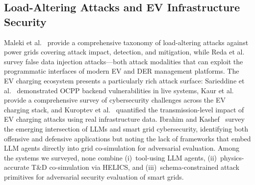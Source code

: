\subsection{Load-Altering Attacks and EV Infrastructure Security}
\label{sec:related:laa}

Maleki et al.~\cite{maleki2025laa} provide a comprehensive taxonomy of load-altering attacks against power grids covering attack impact, detection, and mitigation, while Reda et al.~\cite{reda2022fdia} survey false data injection attacks---both attack modalities that can exploit the programmatic interfaces of modern EV and DER management platforms.
The EV charging ecosystem presents a particularly rich attack surface: Sarieddine et al.~\cite{sarieddine2024ocpp} demonstrated OCPP backend vulnerabilities in live systems, Kaur et al.~\cite{kaur2025evcsur} provide a comprehensive survey of cybersecurity challenges across the EV charging stack, and Kuroptev et al.~\cite{kuroptev2026evgrid} quantified the transmission-level impact of EV charging attacks using real infrastructure data.
Ibrahim and Kashef~\cite{ibrahim2025llmgrid} survey the emerging intersection of LLMs and smart grid cybersecurity, identifying both offensive and defensive applications but noting the lack of frameworks that embed LLM agents directly into grid co-simulation for adversarial evaluation.
Among the systems we surveyed, none combine (i)~tool-using LLM agents, (ii)~physics-accurate T\&D co-simulation via HELICS, and (iii)~schema-constrained attack primitives for adversarial security evaluation of smart grids.
